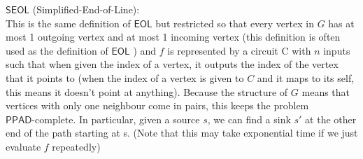 \documentclass[11pt]{article}
\newcommand{\PPADc}{\mathsf{PPAD}\text{-complete}}
\newcommand{\eol}{\mathsf{EOL}}
\newcommand{\seol}{\mathsf{SEOL}}
\begin{document}
\begin{definition}
    \label{seol}
    $\seol$ (Simplified-End-of-Line):\\
    This is the same definition of $\eol$ but restricted so that every vertex in $G$ has at most 1 outgoing vertex and at most 1 incoming vertex (this definition is often used as the definition of $\eol$ \cite{chen2007settling}) and $f$ is represented by a circuit  C with $n$ inputs such that when given the index of a vertex, it outputs the index of the vertex that it points to (when the index of a vertex is given to $C$ and it maps to its self, this means it doesn't point at anything). Because the structure of $G$ means that vertices with only one neighbour come in pairs, this keeps the problem $\PPADc$. In particular, given a source $s$, we can find a sink $s'$ at the other end of the path starting at s. (Note that this may take exponential time if we just evaluate $f$ repeatedly)
\end{definition} 
\end{document}
